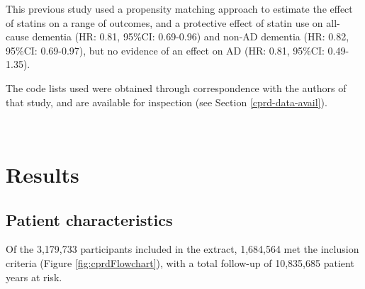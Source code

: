 \documentclass[a4paper, twoside]{templates/ociamthesis}
\begin{document}
This previous study used a propensity matching approach to estimate the effect of statins on a range of outcomes, and a protective effect of statin use on all-cause dementia (HR: 0.81, 95\%CI: 0.69-0.96) and non-AD dementia (HR: 0.82, 95\%CI: 0.69-0.97), but no evidence of an effect on AD (HR: 0.81, 95\%CI: 0.49-1.35).

The code lists used were obtained through correspondence with the authors of that study, and are available for inspection (see Section \ref{cprd-data-avail}).

~

\hypertarget{results-1}{%
\section{Results}\label{results-1}}

\hypertarget{patient-characteristics}{%
\subsection{Patient characteristics}\label{patient-characteristics}}

Of the 3,179,733 participants included in the extract, 1,684,564 met the inclusion criteria (Figure \ref{fig:cprdFlowchart}), with a total follow-up of 10,835,685 patient years at risk.

~
\end{document}
